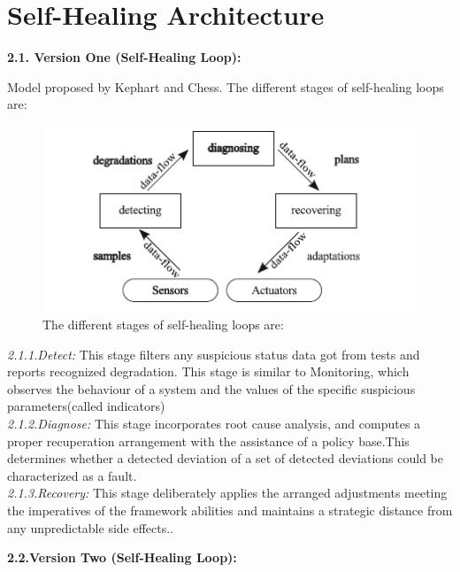 \chapter{Self-Healing Architecture} \label{ch:selfHelingArchitecture}

\textbf{2.1. Version One (Self-Healing Loop):\\}

Model proposed by Kephart and Chess. The different stages of self-healing loops are: \\


\begin{figure}[H]
\includegraphics[width=5in]{img/SelfHealingStagesHarald}
\caption{The different stages of self-healing loops are:}
\end{figure}

\textit{2.1.1.Detect:} This stage filters any suspicious status data got from tests and reports recognized degradation. This stage is similar to Monitoring, which observes the behaviour of a system and the values of the specific suspicious parameters(called indicators)\\

\textit{2.1.2.Diagnose:} This stage incorporates root cause analysis, and computes a proper recuperation arrangement with the assistance of a policy base.This determines whether a detected deviation of a set of detected deviations could be characterized as a fault.\\

\textit{2.1.3.Recovery:} This stage deliberately applies the arranged adjustments meeting the imperatives of the framework abilities and maintains a strategic distance from any unpredictable side effects.\cite{Harald:SelfHealingSurvey:2011}.   

\textbf{2.2.Version Two (Self-Healing Loop):\\}\\

